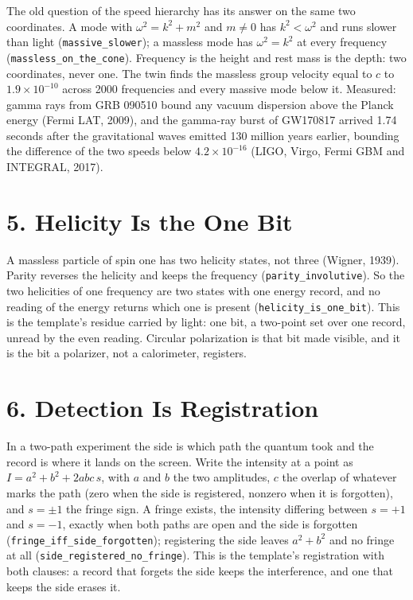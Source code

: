 \documentclass[10pt]{article}
\begin{document}
The old question of the speed hierarchy has its answer on the same two
coordinates. A mode with \(\omega^2=k^2+m^2\) and \(m\neq0\) has
\(k^2<\omega^2\) and runs slower than light (\texttt{massive\_slower});
a massless mode has \(\omega^2=k^2\) at every frequency
(\texttt{massless\_on\_the\_cone}). Frequency is the height and rest
mass is the depth: two coordinates, never one. The twin finds the
massless group velocity equal to \(c\) to \(1.9\times10^{-10}\) across
2000 frequencies and every massive mode below it. Measured: gamma rays
from GRB 090510 bound any vacuum dispersion above the Planck energy
(Fermi LAT, 2009), and the gamma-ray burst of GW170817 arrived 1.74
seconds after the gravitational waves emitted 130 million years earlier,
bounding the difference of the two speeds below \(4.2\times10^{-16}\)
(LIGO, Virgo, Fermi GBM and INTEGRAL, 2017).

\hypertarget{helicity-is-the-one-bit}{%
\section{5. Helicity Is the One Bit}\label{helicity-is-the-one-bit}}

A massless particle of spin one has two helicity states, not three
(Wigner, 1939). Parity reverses the helicity and keeps the frequency
(\texttt{parity\_involutive}). So the two helicities of one frequency
are two states with one energy record, and no reading of the energy
returns which one is present (\texttt{helicity\_is\_one\_bit}). This is
the template's residue carried by light: one bit, a two-point set over
one record, unread by the even reading. Circular polarization is that
bit made visible, and it is the bit a polarizer, not a calorimeter,
registers.

\hypertarget{detection-is-registration}{%
\section{6. Detection Is Registration}\label{detection-is-registration}}

In a two-path experiment the side is which path the quantum took and the
record is where it lands on the screen. Write the intensity at a point
as \(I=a^2+b^2+2abc\,s\), with \(a\) and \(b\) the two amplitudes, \(c\)
the overlap of whatever marks the path (zero when the side is
registered, nonzero when it is forgotten), and \(s=\pm1\) the fringe
sign. A fringe exists, the intensity differing between \(s=+1\) and
\(s=-1\), exactly when both paths are open and the side is forgotten
(\texttt{fringe\_iff\_side\_forgotten}); registering the side leaves
\(a^2+b^2\) and no fringe at all
(\texttt{side\_registered\_no\_fringe}). This is the template's
registration with both clauses: a record that forgets the side keeps the
interference, and one that keeps the side erases it.
\end{document}

